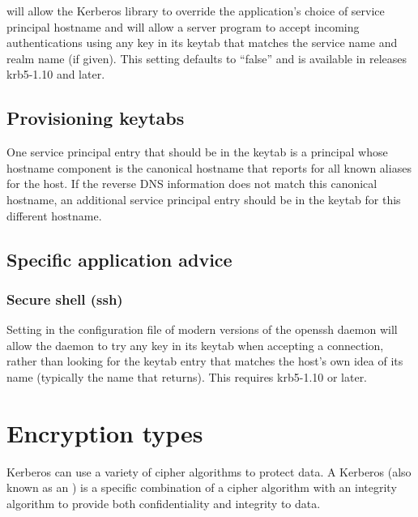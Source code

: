 \documentclass[letterpaper,10pt,english]{sphinxmanual}
\begin{document}
will allow the Kerberos library to override the application’s choice
of service principal hostname and will allow a server program to
accept incoming authentications using any key in its keytab that
matches the service name and realm name (if given).  This setting
defaults to “false” and is available in releases krb5-1.10 and later.


\section{Provisioning keytabs}
\label{\detokenize{admin/princ_dns:provisioning-keytabs}}
One service principal entry that should be in the keytab is a
principal whose hostname component is the canonical hostname that
 reports for all known aliases for the host.  If the
reverse DNS information does not match this canonical hostname, an
additional service principal entry should be in the keytab for this
different hostname.


\section{Specific application advice}
\label{\detokenize{admin/princ_dns:specific-application-advice}}

\subsection{Secure shell (ssh)}
\label{\detokenize{admin/princ_dns:secure-shell-ssh}}
Setting  in the configuration file
of modern versions of the openssh daemon will allow the daemon to try
any key in its keytab when accepting a connection, rather than looking
for the keytab entry that matches the host’s own idea of its name
(typically the name that  returns).  This requires
krb5-1.10 or later.


\chapter{Encryption types}
\label{\detokenize{admin/enctypes:enctypes}}\label{\detokenize{admin/enctypes::doc}}\label{\detokenize{admin/enctypes:encryption-types}}
Kerberos can use a variety of cipher algorithms to protect data.  A
Kerberos  (also known as an ) is a
specific combination of a cipher algorithm with an integrity algorithm
to provide both confidentiality and integrity to data.
\end{document}
